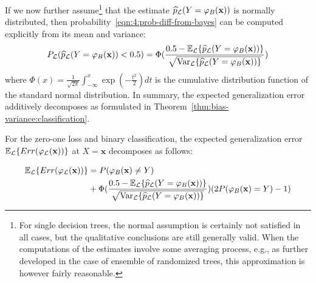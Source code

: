 If we now further assume\footnote{For single decision trees, the normal
assumption is certainly not satisfied in all cases, but the qualitative
conclusions are still generally valid. When the computations of the estimates
involve some averaging process, e.g., as further developed in the case of
ensemble of randomized trees, this approximation is however fairly reasonable.}
that the estimate $\widehat{p}_{\cal L}(Y=\varphi_B(\mathbf{x}))$ is normally distributed,
then probability~\ref{eqn:4:prob-diff-from-bayes} can be computed explicitly
from its mean and variance:
\begin{equation}
P_{\cal L}(\widehat{p}_{\cal L}(Y=\varphi_B(\mathbf{x})) < 0.5) = \Phi(\frac{0.5 - \mathbb{E}_{\cal L}\{ \widehat{p}_{\cal L}(Y=\varphi_B(\mathbf{x})) \}}{\sqrt{\text{Var}_{\cal L}\{ \widehat{p}_{\cal L}(Y=\varphi_B(\mathbf{x})) \}}})
\end{equation}
where $\Phi(x)=\frac{1}{\sqrt{2\pi}} \int_{-\infty}^x \exp(-\frac{t^2}{2}) dt$
is the cumulative distribution function of the standard normal distribution.
In summary, the expected generalization error additively
decomposes as formulated in Theorem~\ref{thm:bias-variance:classification}.

\begin{theorem}\label{thm:bias-variance:classification}
For the zero-one loss and binary classification, the expected
generalization error $\mathbb{E}_{\cal L} \{ Err(\varphi_{\cal L}(\mathbf{x}))
\}$ at $X=\mathbf{x}$ decomposes as follows:

\begin{align}
\mathbb{E}_{\cal L} \{ Err(\varphi_{\cal L}(\mathbf{x})) \} &= P(\varphi_B(\mathbf{x})\neq Y) \\
                                                            &+ \Phi(\frac{0.5 - \mathbb{E}_{\cal L}\{ \widehat{p}_{\cal L}(Y=\varphi_B(\mathbf{x})) \}}{\sqrt{\text{Var}_{\cal L}\{ \widehat{p}_{\cal L}(Y=\varphi_B(\mathbf{x})) \}}}) (2 P(\varphi_B(\mathbf{x}) = Y) - 1) \nonumber
\end{align}
\end{theorem}

